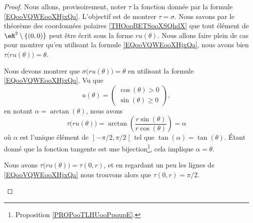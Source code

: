 \begin{proof}
	Nous allons, provisoirement, noter \( \tau\) la fonction donnée par la formule \eqref{EQooVQWEooXHjxQa}. L'objectif est de montrer \( \tau=\sigma\). Nous savons par le théorème des coordonnées polaires \ref{THOooBETSooXSQhdX} que tout élément de \( \eR^2\setminus\{ (0,0) \}\) peut être écrit sous la forme \( ru(\theta)\). Nous allons faire plein de cas pour montrer qu'en utilisant la formule \eqref{EQooVQWEooXHjxQa}, nous avons bien \(\tau\big( ru(\theta) \big)=\theta\).

	\begin{subproof}
		Nous devons montrer que \( \sigma\big( ru(\theta) \big)=\theta\) en utilisant la formule \eqref{EQooVQWEooXHjxQa}. Vu que
		\begin{equation}
			u(\theta)=\begin{pmatrix}
				\cos(\theta)>0 \\
				\sin(\theta)\geq 0
			\end{pmatrix},
		\end{equation}
		en notant \( \alpha=\arctan(\theta)\), nous avons
		\begin{equation}
			\tau\big( ru(\theta) \big)=\arctan\left( \frac{ r\sin(\theta) }{ r\cos(\theta) } \right)=\alpha
		\end{equation}
		où \( \alpha\) est l'unique élément de \( \mathopen] -\pi/2,\pi/2\mathclose[\) tel que \( \tan(\alpha)=\tan(\theta)\). Étant donné que la fonction tangente est une bijection\footnote{Proposition \ref{PROPooTLHUooPpqupE}.}, cela implique \( \alpha=\theta\).

			\spitem[Si \( \theta=\pi/2\)]
			Nous avons \( \tau\big( ru(\theta) \big)=\tau(0,r)\), et en regardant un peu les lignes de \eqref{EQooVQWEooXHjxQa} nous trouvons alors que \( \tau(0,r)=\pi/2\).


\end{subproof}
\end{proof}
